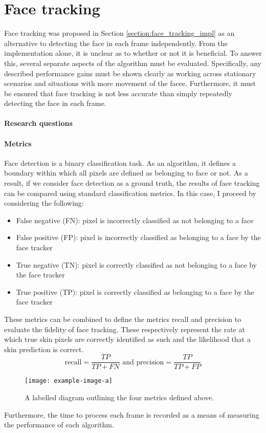 \section{Face tracking}
\label{section:face_tracking}
Face tracking was proposed in Section \ref{section:face_tracking_impl} as an alternative to detecting the face in each frame independently.
From the implementation alone, it is unclear as to whether or not it is beneficial. To answer this, several separate aspects of the algorithm must be evaluated. 
Specifically, any described performance gains must be shown clearly as working across stationary scenarios and situations with more movement of the facee. Furthermore, it must be ensured that face tracking is not less accurate than simply repeatedly detecting the face in each frame.
\paragraph{Research questions}

\paragraph{Metrics}
Face detection is a binary classification task. As an algorithm, it defines a boundary within which all pixels are defined as belonging to face or not.
As a result, if we consider face detection as a ground truth, the results of face tracking can be compared using standard classification metrics. In this case, I proceed by considering the following: 
\begin{itemize}
   \item False negative (FN): pixel is incorrectly classified as not belonging to a face
   \item False positive (FP): pixel is incorrectly classified as belonging to a face by the face tracker
   \item True negative (TN): pixel is correctly classified as not belonging to a face by the face tracker
   \item True positive (TP): pixel is correctly classified as belonging to a face by the face tracker
\end{itemize}
These metrics can be combined to define the metrics recall and precision to evaluate the fidelity of face tracking. These respectively represent the rate at which true skin pixels are correctly identified as such and the likelihood that a skin prediction is correct.
\begin{equation*}
    \mathrm{recall} = \frac{TP}{TP + FN} \text{ and } \mathrm{precision} = \frac{TP}{TP+FP}
\end{equation*}
\begin{figure}[H]
    \texttt{[image: example-image-a]}
   \caption{A labelled diagram outlining the four metrics defined above.} 
\end{figure}
\noindent
Furthermore, the time to process each frame is recorded as a means of measuring the performance of each algorithm.
